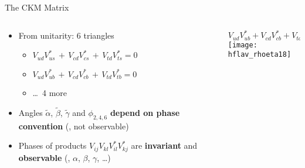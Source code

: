 \begin{frame}{The CKM Matrix}
\begin{columns}[T]
\begin{column}{.6\textwidth}
\begin{itemize}
                \item From unitarity: 6 triangles
                \begin{itemize}
                    \item $V_{\!ud} V^*_{\!us} \,+\, V_{\!cd} V^*_{\!cs} \,+\, V_{\!td} V^*_{\!ts} = 0$
                    \item $V_{\!ud} V^*_{\!ub} \,+\, V_{\!cd} V^*_{\!cb} \,+\, V_{\!td} V^*_{\!tb} = 0$
                    \item \ldots~4 more 
                \end{itemize}
                \item Angles $\tilde\alpha$, $\tilde\beta$, $\tilde\gamma$ and $\phi_{2,4,6}$ \textbf{depend on phase convention} (\ie{}, not observable)
                \item Phases of products $V_{\!ij} V_{\!kl} V^*_{\!il} V^*_{kj}$ are \textbf{invariant} and \textbf{observable} (\eg{}, $\alpha$, $\beta$, $\gamma$, \ldots)
            \end{itemize}
        \end{column}
        \begin{column}{.4\textwidth}
            \hfill
            $V_{\!ud} V^*_{\!ub} + V_{\!cd} V^*_{\!cb} + V_{\!td} V^*_{\!tb} = 0$\\
            \texttt{[image: hflav\_rhoeta18]}
        \end{column}
    \end{columns}
\end{frame}

